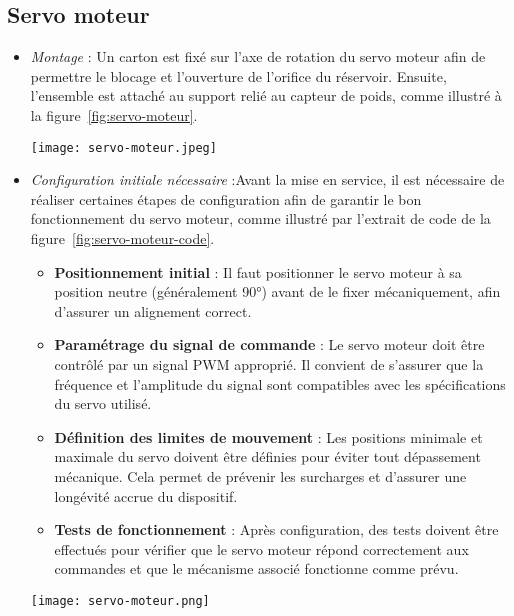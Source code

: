 \subsection{Servo moteur}
\begin{itemize}
	\item \textit{Montage} : Un carton est fixé sur l'axe de rotation du servo moteur afin de permettre le blocage et l'ouverture de l'orifice du réservoir. Ensuite, l'ensemble est attaché au support relié au capteur de poids, comme illustré à la figure~\ref{fig:servo-moteur}.
	
	\begin{minipage}{\linewidth}
  		\centering
  		\texttt{[image: servo-moteur.jpeg]}
  		\label{fig:servo-moteur}
	\end{minipage}
	
	\item \textit{Configuration initiale nécessaire} :Avant la mise en service, il est nécessaire de réaliser certaines étapes de configuration afin de garantir le bon fonctionnement du servo moteur, comme illustré par l'extrait de code de la figure~\ref{fig:servo-moteur-code}.
	\begin{itemize}
		\item \textbf{Positionnement initial} : Il faut positionner le servo moteur à sa position neutre (généralement 90°) avant de le fixer mécaniquement, afin d'assurer un alignement correct.
		\item \textbf{Paramétrage du signal de commande} : Le servo moteur doit être contrôlé par un signal PWM approprié. Il convient de s'assurer que la fréquence et l'amplitude du signal sont compatibles avec les spécifications du servo utilisé.
		\item \textbf{Définition des limites de mouvement} : Les positions minimale et maximale du servo doivent être définies pour éviter tout dépassement mécanique. Cela permet de prévenir les surcharges et d'assurer une longévité accrue du dispositif.
		\item \textbf{Tests de fonctionnement} : Après configuration, des tests doivent être effectués pour vérifier que le servo moteur répond correctement aux commandes et que le mécanisme associé fonctionne comme prévu.
	\end{itemize}
	
	\begin{minipage}{\linewidth}
  		\centering
  		\texttt{[image: servo-moteur.png]}
  		\label{fig:servo-moteur-code}
	\end{minipage}
\end{itemize}



